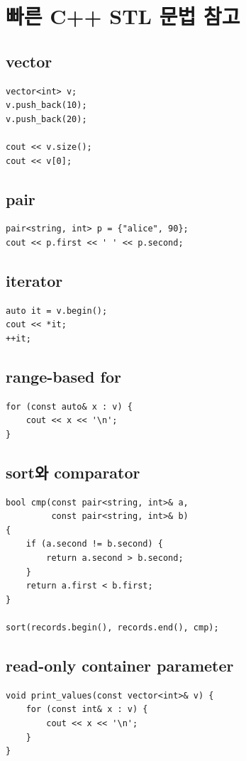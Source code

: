 \chapter{빠른 C++ STL 문법 참고}

\section{vector}
\begin{lstlisting}
vector<int> v;
v.push_back(10);
v.push_back(20);

cout << v.size();
cout << v[0];
\end{lstlisting}

\section{pair}
\begin{lstlisting}
pair<string, int> p = {"alice", 90};
cout << p.first << ' ' << p.second;
\end{lstlisting}

\section{iterator}
\begin{lstlisting}
auto it = v.begin();
cout << *it;
++it;
\end{lstlisting}

\section{range-based for}
\begin{lstlisting}
for (const auto& x : v) {
    cout << x << '\n';
}
\end{lstlisting}

\section{sort와 comparator}
\begin{lstlisting}
bool cmp(const pair<string, int>& a,
         const pair<string, int>& b)
{
    if (a.second != b.second) {
        return a.second > b.second;
    }
    return a.first < b.first;
}

sort(records.begin(), records.end(), cmp);
\end{lstlisting}

\section{read-only container parameter}
\begin{lstlisting}
void print_values(const vector<int>& v) {
    for (const int& x : v) {
        cout << x << '\n';
    }
}
\end{lstlisting}

